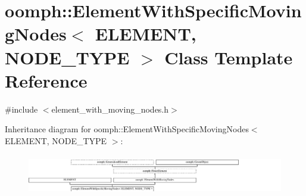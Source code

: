 \hypertarget{classoomph_1_1ElementWithSpecificMovingNodes}{}\section{oomph\+:\+:Element\+With\+Specific\+Moving\+Nodes$<$ E\+L\+E\+M\+E\+NT, N\+O\+D\+E\+\_\+\+T\+Y\+PE $>$ Class Template Reference}
\label{classoomph_1_1ElementWithSpecificMovingNodes}


{\ttfamily \#include $<$element\+\_\+with\+\_\+moving\+\_\+nodes.\+h$>$}

Inheritance diagram for oomph\+:\+:Element\+With\+Specific\+Moving\+Nodes$<$ E\+L\+E\+M\+E\+NT, N\+O\+D\+E\+\_\+\+T\+Y\+PE $>$\+:\begin{figure}[H]
\begin{center}
\leavevmode
\includegraphics[height=1.773555cm]{classoomph_1_1ElementWithSpecificMovingNodes}
\end{center}
\end{figure}
